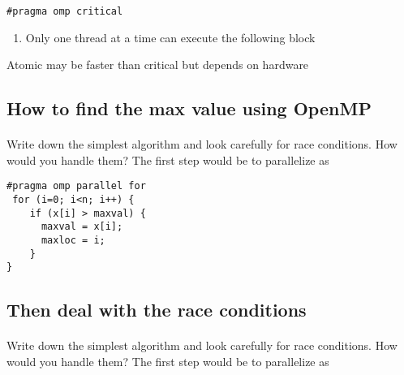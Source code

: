 \documentclass[%
oneside,                 %
final,                   %
10pt]{article}
\begin{document}
\noindent


\begin{verbatim}
#pragma omp critical

\end{verbatim}

\begin{enumerate}
\item Only one thread at a time can execute the following block
\end{enumerate}

\noindent
Atomic may be faster than critical but depends on hardware



\subsection*{How to find the max value using OpenMP}

\paragraph{}
Write down the simplest algorithm and look carefully for race conditions. How would you handle them? 
The first step would be to parallelize as 








\begin{verbatim}
#pragma omp parallel for
 for (i=0; i<n; i++) {
    if (x[i] > maxval) {
      maxval = x[i];
      maxloc = i; 
    }
}

\end{verbatim}



\subsection*{Then deal with the race conditions}

\paragraph{}
Write down the simplest algorithm and look carefully for race conditions. How would you handle them? 
The first step would be to parallelize as 
\end{document}
